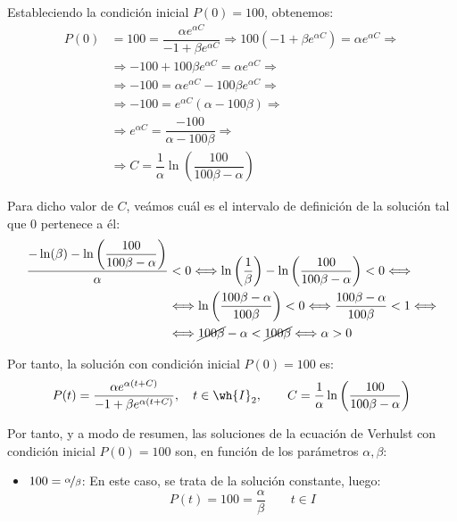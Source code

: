 \begin{ejercicio}
\begin{itemize}
        Estableciendo la condición inicial $P(0)=100$, obtenemos:
        \begin{align*}
            P(0) &= 100 = \dfrac{\alpha e^{\alpha C}}{-1+\beta e^{\alpha C}} \Longrightarrow 100(-1+\beta e^{\alpha C}) = \alpha e^{\alpha C} \Longrightarrow \\ &\Longrightarrow -100 + 100\beta e^{\alpha C} = \alpha e^{\alpha C} \Longrightarrow \\ &\Longrightarrow -100 = \alpha e^{\alpha C} - 100\beta e^{\alpha C} \Longrightarrow \\ &\Longrightarrow -100 = e^{\alpha C}(\alpha - 100\beta) \Longrightarrow \\ &\Longrightarrow e^{\alpha C} = \dfrac{-100}{\alpha - 100\beta} \Longrightarrow \\ &\Longrightarrow C =\dfrac{1}{\alpha} \ln\left(\dfrac{100}{100\beta-\alpha}\right)
        \end{align*}

        Para dicho valor de $C$, veámos cuál es el intervalo de definición de la solución tal que $0$ pertenece a él:
        \begin{align*}
            \dfrac{-\ln(\beta)-\ln\left(\dfrac{100}{100\beta-\alpha}\right)}{\alpha}&<0 \Longleftrightarrow 
            \ln\left(\dfrac{1}{\beta}\right) - \ln\left(\dfrac{100}{100\beta-\alpha}\right)<0 \Longleftrightarrow \\& \Longleftrightarrow
            \ln\left(\dfrac{100\beta-\alpha}{100\beta}\right)<0 \Longleftrightarrow
            \dfrac{100\beta-\alpha}{100\beta}<1 \Longleftrightarrow \\& \Longleftrightarrow
            \cancel{100\beta}-\alpha<\cancel{100\beta} \Longleftrightarrow
            \alpha>0
        \end{align*}

        Por tanto, la solución con condición inicial $P(0)=100$ es:
        \begin{equation*}
            P(t) = \dfrac{\alpha e^{\alpha (t + C)}}{-1+\beta e^{\alpha (t + C)}}, \quad t\in \wh{I}_2, \qquad C=\dfrac{1}{\alpha}\ln\left(\dfrac{100}{100\beta-\alpha}\right)
        \end{equation*}
    \end{itemize}

    Por tanto, y a modo de resumen, las soluciones de la ecuación de Verhulst con condición inicial $P(0)=100$ son, en función de los parámetros $\alpha, \beta$:
    \begin{itemize}
        \item \ul{$100=\nicefrac{\alpha}{\beta}$}: En este caso, se trata de la solución constante, luego:
        \begin{equation*}
            P(t) = 100 = \frac{\alpha}{\beta} \qquad t\in I
        \end{equation*}


\end{itemize}
\end{ejercicio}
